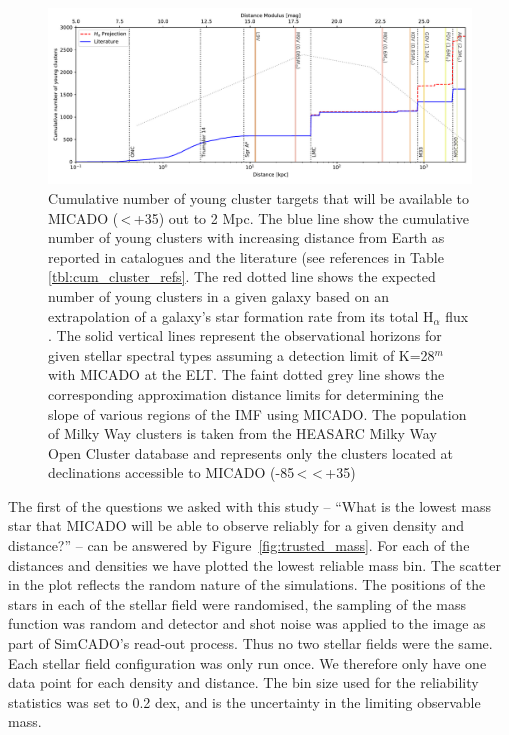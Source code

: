 \begin{figure}

    \centering
    \includegraphics[width=\textwidth]{images/young_clusters_within_2Mpc_incl_MW.pdf}

    \caption{Cumulative number of young cluster targets that will be available to MICADO (\textdelta\,\textless\,+35\textdegree) out to 2 Mpc. The blue line show the cumulative number of young clusters with increasing distance from Earth as reported in catalogues and the literature (see references in Table \ref{tbl:cum_cluster_refs}.
    The red dotted line shows the expected number of young clusters in a given galaxy based on an extrapolation of a galaxy's star formation rate from its total H$_\alpha$ flux \citep{caldwell09}.
    The solid vertical lines represent the observational horizons for given stellar spectral types assuming a detection limit of K=28$^m$ with MICADO at the ELT. The faint dotted grey line shows the corresponding approximation distance limits for determining the slope of various regions of the IMF using MICADO.
    The population of Milky Way clusters is taken from the HEASARC Milky Way Open Cluster database \citep{heasarc_mwsc} and represents only the clusters located at declinations accessible to MICADO (-85\textdegree\,\textless\,\textdelta\,\textless\,+35\textdegree)
    }
    \label{fig:local_group_cluster_number}

\end{figure}


The first of the questions we asked with this study -- ``What is the lowest mass star that MICADO will be able to observe reliably for a given density and distance?'' -- can be answered by Figure~\ref{fig:trusted_mass}. 
For each of the distances and densities we have plotted the lowest reliable mass bin. 
The scatter in the plot reflects the random nature of the simulations. 
The positions of the stars in each of the stellar field were randomised, the sampling of the mass function was random and detector and shot noise was applied to the image as part of SimCADO's read-out process. 
Thus no two stellar fields were the same. 
Each stellar field configuration was only run once. 
We therefore only have one data point for each density and distance. 
The bin size used for the reliability statistics was set to 0.2 dex, and is the uncertainty in the limiting observable mass.

